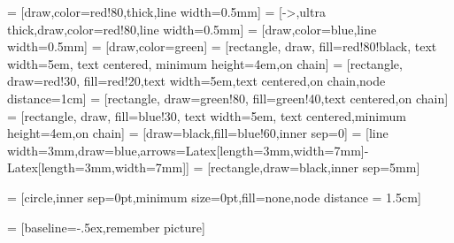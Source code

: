  = [draw,color=red!80,thick,line width=0.5mm]
 = [->,ultra thick,draw,color=red!80,line width=0.5mm]
 = [draw,color=blue,line width=0.5mm]
 = [draw,color=green]
 = [rectangle, draw, fill=red!80!black, text width=5em, text centered, minimum height=4em,on chain]
 = [rectangle, draw=red!30, fill=red!20,text width=5em,text centered,on chain,node distance=1cm]
 = [rectangle, draw=green!80, fill=green!40,text centered,on chain]
 = [rectangle, draw, fill=blue!30, text width=5em, text centered,minimum height=4em,on chain]
 = [draw=black,fill=blue!60,inner sep=0]
 = [line width=3mm,draw=blue,arrows={Latex[length=3mm,width=7mm]-Latex[length=3mm,width=7mm]}]
 = [rectangle,draw=black,inner sep=5mm]



 = [circle,inner sep=0pt,minimum size=0pt,fill=none,node distance = 1.5cm]

 = [baseline=-.5ex,remember picture]

\newcommand{\matlab}{MATLAB\xspace}

